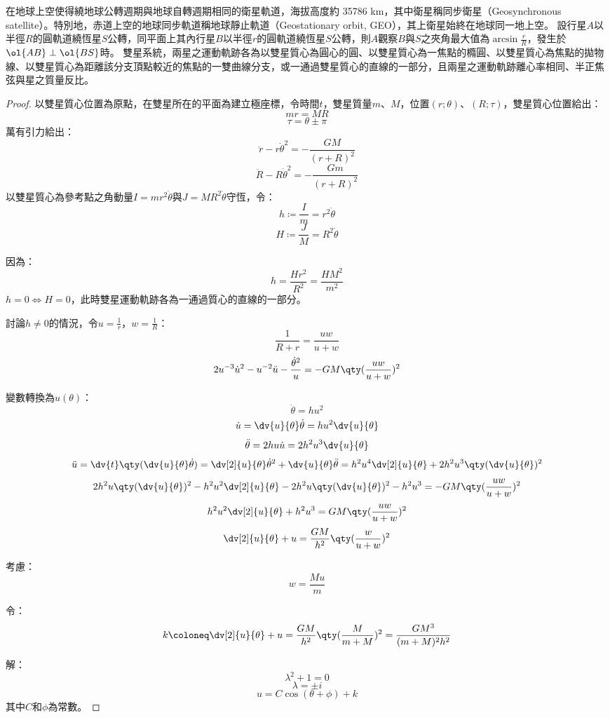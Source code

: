 \documentclass[a4paper,12pt]{article}
\begin{document}
在地球上空使得繞地球公轉週期與地球自轉週期相同的衛星軌道，海拔高度約 35786 km，其中衛星稱同步衛星（Geosynchronous satellite）。特別地，赤道上空的地球同步軌道稱地球靜止軌道（Geostationary orbit, GEO），其上衛星始終在地球同一地上空。
設行星$A$以半徑$R$的圓軌道繞恆星$S$公轉，同平面上其內行星$B$以半徑$r$的圓軌道繞恆星$S$公轉，則$A$觀察$B$與$S$之夾角最大值為$\arcsin\frac{r}{R}$，發生於$\ol{AB}\perp\ol{BS}$時。
雙星系統，兩星之運動軌跡各為以雙星質心為圓心的圓、以雙星質心為一焦點的橢圓、以雙星質心為焦點的拋物線、以雙星質心為距離該分支頂點較近的焦點的一雙曲線分支，或一通過雙星質心的直線的一部分，且兩星之運動軌跡離心率相同、半正焦弦與星之質量反比。
\begin{proof}
以雙星質心位置為原點，在雙星所在的平面為建立極座標，令時間$t$，雙星質量$m$、$M$，位置$(r;\theta)$、$(R;\tau)$，雙星質心位置給出：
\[mr=MR\]
\[\tau=\theta\pm\pi\]
萬有引力給出：
\[\ddot{r}-r\dot{\theta}^2=-\frac{GM}{(r+R)^2}\]
\[\ddot{R}-R\dot{\theta}^2=-\frac{Gm}{(r+R)^2}\]
以雙星質心為參考點之角動量$I=mr^2\dot{\theta}$與$J=MR^2\dot{\theta}$守恆，令：
\[h\coloneq\frac{I}{m}=r^2\dot{\theta}\]
\[H\coloneq\frac{J}{M}=R^2\dot{\theta}\]

因為：
\[h=\frac{Hr^2}{R^2}=\frac{HM^2}{m^2}\]
$h=0\iff H=0$，此時雙星運動軌跡各為一通過質心的直線的一部分。

討論$h\neq0$的情況，令$u=\frac{1}{r}$，$w=\frac{1}{R}$：
\[\frac{1}{R+r}=\frac{uw}{u+w}\]
\[2u^{-3}\dot{u}^2-u^{-2}\ddot{u}-\frac{\dot{\theta}^2}{u}=-GM\qty(\frac{uw}{u+w})^2\]

變數轉換為$u(\theta)$：
\[\dot{\theta}=h u^2\]
\[\dot{u}=\dv{u}{\theta}\dot{\theta}=h u^2\dv{u}{\theta}\]
\[\ddot{\theta}=2h u\dot{u}=2h^2u^3\dv{u}{\theta}\]
\[\ddot{u}=\dv{t}\qty(\dv{u}{\theta}\dot{\theta})=\dv[2]{u}{\theta}\dot{\theta}^2+\dv{u}{\theta}\ddot{\theta}=h^2u^4\dv[2]{u}{\theta}+2h^2u^3\qty(\dv{u}{\theta})^2\]
\[2h^2u\qty(\dv{u}{\theta})^2-h^2u^2\dv[2]{u}{\theta}-2h^2u\qty(\dv{u}{\theta})^2-h^2u^3=-GM\qty(\frac{uw}{u+w})^2\]
\[h^2u^2\dv[2]{u}{\theta}+h^2u^3=GM\qty(\frac{uw}{u+w})^2\]
\[\dv[2]{u}{\theta}+u=\frac{GM}{h^2}\qty(\frac{w}{u+w})^2\]

考慮：
\[w=\frac{Mu}{m}\]

令：
\[k\coloneq\dv[2]{u}{\theta}+u=\frac{GM}{h^2}\qty(\frac{M}{m+M})^2=\frac{GM^3}{(m+M)^2h^2}\]

解：
\[\lambda^2+1=0\]
\[\lambda=\pm i\]
\[u=C\cos(\theta+\phi)+k\]
其中$C$和$\phi$為常數。


\end{proof}
\end{document}
